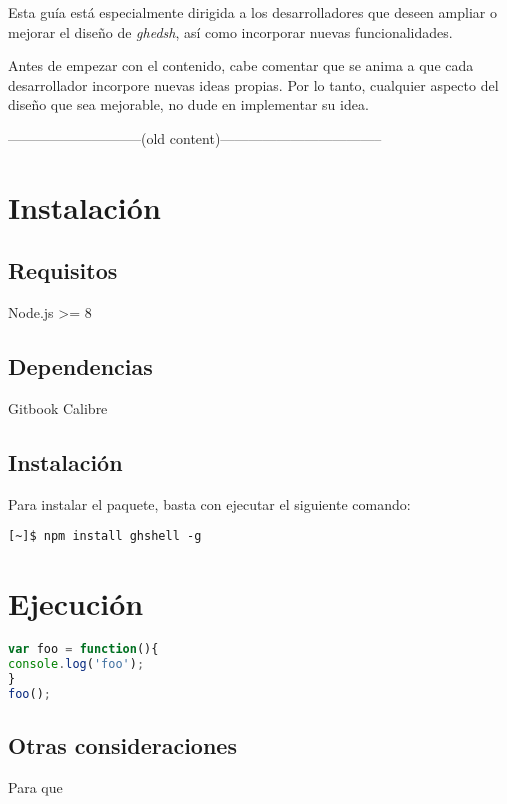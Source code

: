 Esta guía está especialmente dirigida a los desarrolladores que deseen ampliar o mejorar el diseño de {\it ghedsh}, así como incorporar nuevas funcionalidades.
\bigskip

Antes de empezar con el contenido, cabe comentar que se anima a que cada desarrollador incorpore nuevas ideas propias. Por lo tanto, cualquier
aspecto del diseño que sea mejorable, no dude en implementar su idea.
\bigskip
\bigskip

-----------------------------(old content)-----------------------------------
\section{Instalación}
\label{Apendice2:instalacion}

\subsection{Requisitos}
\label{subsec:b.1.1}

Node.js \textgreater = 8

\subsection{Dependencias}
\label{subsec:b.1.2}

Gitbook
Calibre

\subsection{Instalación}
\label{subsec:b.1.3}

Para instalar el paquete, basta con ejecutar el siguiente comando:
\begin{verbatim}
[~]$ npm install ghshell -g
\end{verbatim}


\section{Ejecución}
\label{Apendice2:ejecucion}

\begin{lstlisting}[language=JavaScript]
var foo = function(){
console.log('foo');
}
foo();
\end{lstlisting}
\bigskip

\subsection{Otras consideraciones}
\label{subsec:Apendice2.1}

Para que